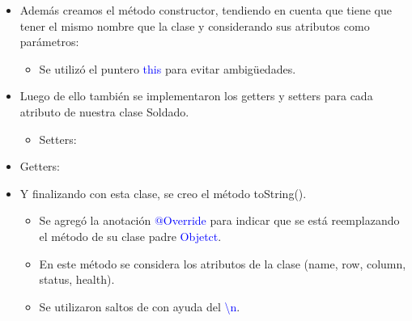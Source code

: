 \documentclass{article}
\begin{document}
        \begin{itemize}
            \item Además creamos el método constructor, tendiendo en cuenta que tiene que tener el mismo nombre que la clase y considerando sus atributos como parámetros:
            \begin{itemize}
                \item Se utilizó el puntero \textcolor{blue}{this} para evitar ambigüedades.
            \end{itemize}
        \end{itemize}

        

        \begin{itemize}
            \item Luego de ello también se implementaron los getters y setters para cada atributo de nuestra clase Soldado.
            \begin{itemize}
                \item Setters: 
            \end{itemize}
        \end{itemize}

        

        \begin{itemize}
            \begin{itemize}
                \item Getters: 
            \end{itemize}
        \end{itemize}

        

        \begin{itemize}
            \item Y finalizando con esta clase, se creo el método toString().
            \begin{itemize}
                \item Se agregó la anotación \textcolor{blue}{@Override} para indicar que se está reemplazando el método de su clase padre \textcolor{blue}{Objetct}.
                \item En este método se considera los atributos de la clase (name, row, column, status, health).
                \item Se utilizaron saltos de con ayuda del \textcolor{blue}{\textbackslash n}.
            \end{itemize}
        \end{itemize}
\end{document}

